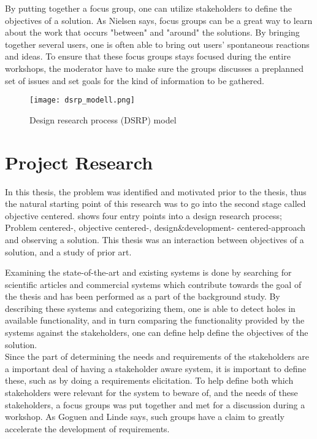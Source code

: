 By putting together a focus group, one can utilize stakeholders to define the
objectives of a solution. As Nielsen\cite{FocusGroupstoStudyWorkPractice} says,
focus groups can be a great way to learn about the work that occurs "between"
and "around" the solutions. By bringing together several users, one is often 
able to bring out users' spontaneous reactions and ideas\cite{nielsen1997use}.
To ensure that these focus groups stays focused during the entire workshops,
the moderator have to make sure the groups discusses a preplanned set of issues
and set goals for the kind of information to be gathered.


\begin{figure}[!htbp]
	\texttt{[image: dsrp\_modell.png]}
	\caption[Design science research process (DSRP) model]{Design research process (DSRP)
	model\cite{peffers2006design}}
	\label{fig:DSRP}
\end{figure}



\section{Project Research} %
\label{sec:workshops}
In this thesis, the problem was 
identified and motivated prior to the thesis, thus the natural starting 
point of this research was to go into the second stage called objective 
centered.  shows four entry points into a design 
research process; Problem centered-, objective centered-, design\&development-
centered-approach and observing a solution. This thesis was an interaction 
between objectives of a solution, and a study of prior art.

Examining the state-of-the-art and existing systems is done by searching for
scientific articles and commercial systems which contribute towards the goal 
of the thesis and has been performed as a part of the background study. By 
describing these systems and categorizing them, one is able to detect holes in 
available functionality, and in turn comparing the functionality provided by 
the systems against the stakeholders, one can define help define the 
objectives of the solution. \\

Since the part of determining the needs and requirements of the stakeholders 
are a important deal of having a stakeholder aware system, it is important to
define these, such as by doing a requirements elicitation. To help define both 
which stakeholders were relevant for the system to beware of, and the needs of 
these stakeholders, a focus groups was put together and met for a discussion
during a workshop. As Goguen and Linde \cite{goguen1993techniques} says, such 
groups have a claim to greatly accelerate the development of requirements.


